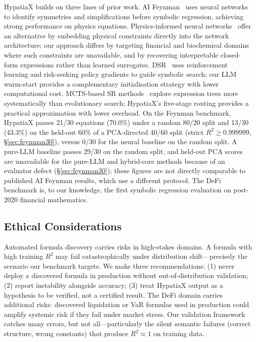 \documentclass[twoside,11pt]{article}
\newcommand{\Rsq}{R^{2}}
\begin{document}
HypatiaX builds on three lines of prior work. AI Feynman~\citep{udrescu2020ai} uses neural networks to identify symmetries and simplifications before symbolic regression, achieving strong performance on physics equations. Physics-informed neural networks~\citep{raissi2019physics,karniadakis2021physics} offer an alternative by embedding physical constraints directly into the network architecture; our approach differs by targeting financial and biochemical domains where such constraints are unavailable, and by recovering interpretable closed-form expressions rather than learned surrogates. DSR~\citep{petersen2021deep,landajuela2022unified} uses reinforcement learning and risk-seeking policy gradients to guide symbolic search; our LLM warm-start provides a complementary initialisation strategy with lower computational cost. MCTS-based SR methods~\citep{sun2022symbolic} explore expression trees more systematically than evolutionary search; HypatiaX's five-stage routing provides a practical approximation with lower overhead. On the Feynman benchmark, HypatiaX passes 21/30 equations (70.0\%) under a random 80/20 split and 13/30 (43.3\%) on the held-out 60\% of a PCA-directed 40/60 split (strict $\Rsq \geq 0.999999$, \S\ref{sec:feynman30}), versus 0/30 for the neural baseline on the random split. A pure-LLM baseline passes 29/30 on the random split, and held-out PCA scores are unavailable for the pure-LLM and hybrid-core methods because of an evaluator defect (\S\ref{sec:feynman30}); these figures are not directly comparable to published AI Feynman results, which use a different protocol. The DeFi benchmark is, to our knowledge, the first symbolic regression evaluation on post-2020 financial mathematics.

\subsection{Ethical Considerations}\label{subsec:ethical-considerations}
\label{sec:disc_ethics}

Automated formula discovery carries risks in high-stakes domains. A formula with high training $\Rsq$ may fail catastrophically under distribution shift---precisely the scenario our benchmark targets. We make three recommendations: (1) never deploy a discovered formula in production without out-of-distribution validation; (2) report instability alongside accuracy; (3) treat HypatiaX output as a hypothesis to be verified, not a certified result. The DeFi domain carries additional risks: discovered liquidation or VaR formulas used in production could amplify systemic risk if they fail under market stress. Our validation framework catches many errors, but not all---particularly the silent semantic failures (correct structure, wrong constants) that produce $\Rsq \approx 1$ on training data.
\end{document}
